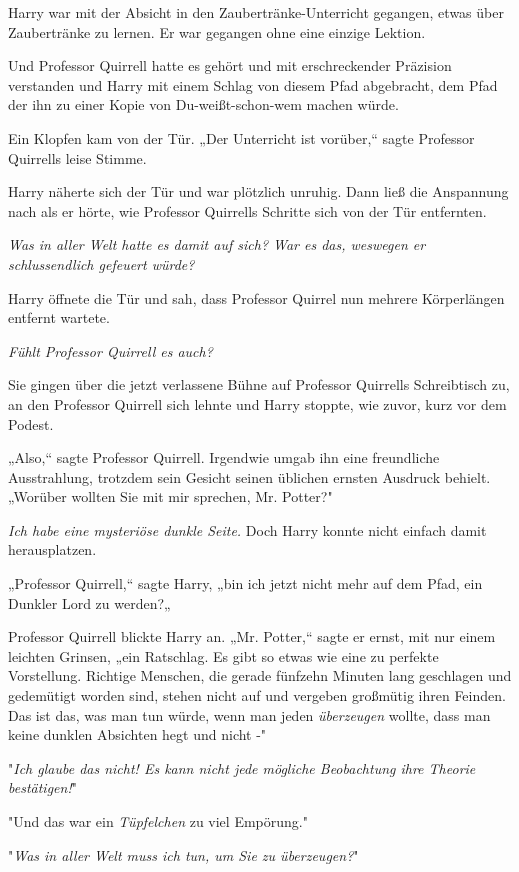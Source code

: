 {Harry war mit der Absicht in den Zaubertränke-Unterricht gegangen, etwas über Zaubertränke zu lernen. Er war gegangen ohne eine einzige Lektion.

Und Professor Quirrell hatte es gehört und mit erschreckender Präzision verstanden und Harry mit einem Schlag von diesem Pfad abgebracht, dem Pfad der ihn zu einer Kopie von Du-weißt-schon-wem machen würde.

Ein Klopfen kam von der Tür. „Der Unterricht ist vorüber,“ sagte Professor Quirrells leise Stimme.

Harry näherte sich der Tür und war plötzlich unruhig. Dann ließ die Anspannung nach als er hörte, wie Professor Quirrells Schritte sich von der Tür entfernten.

\emph{Was in aller Welt hatte es damit auf sich? War es das, weswegen er schlussendlich gefeuert würde?}

Harry öffnete die Tür und sah, dass Professor Quirrel nun mehrere Körperlängen entfernt wartete.

\emph{Fühlt Professor Quirrell es auch?}

Sie gingen über die jetzt verlassene Bühne auf Professor Quirrells Schreibtisch zu, an den Professor Quirrell sich lehnte und Harry stoppte, wie zuvor, kurz vor dem Podest.

„Also,“ sagte Professor Quirrell. Irgendwie umgab ihn eine freundliche Ausstrahlung, trotzdem sein Gesicht seinen üblichen ernsten Ausdruck behielt. „Worüber wollten Sie mit mir sprechen, Mr. Potter?"

\emph{Ich habe eine mysteriöse dunkle Seite.} Doch Harry konnte nicht einfach damit herausplatzen.

„Professor Quirrell,“ sagte Harry, „bin ich jetzt nicht mehr auf dem Pfad, ein Dunkler Lord zu werden?„

Professor Quirrell blickte Harry an. „Mr. Potter,“ sagte er ernst, mit nur einem leichten Grinsen, „ein Ratschlag. Es gibt so etwas wie eine zu perfekte Vorstellung. Richtige Menschen, die gerade fünfzehn Minuten lang geschlagen und gedemütigt worden sind, stehen nicht auf und vergeben großmütig ihren Feinden. Das ist das, was man tun würde, wenn man jeden \emph{überzeugen} wollte, dass man keine dunklen Absichten hegt und nicht -"

"\emph{Ich glaube das nicht! Es kann nicht jede mögliche Beobachtung ihre Theorie bestätigen!}"

"Und das war ein \emph{Tüpfelchen} zu viel Empörung."

"\emph{Was in aller Welt muss ich tun, um Sie zu überzeugen?}"

}
